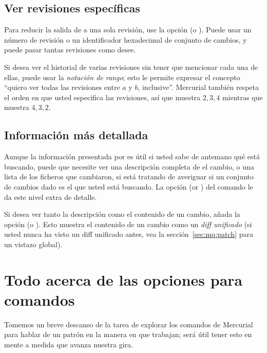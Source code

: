 \subsection{Ver revisiones específicas}

Para reducir la salida de  a una sola revisión, use la  
opción  (o ).  Puede usar un número
de revisión o un identificador hexadecimal de conjunto de cambios, y
puede pasar tantas revisiones como desee.


Si desea ver el historial de varias revisiones sin tener que mencionar
cada una de ellas, puede usar la \emph{notación de rango}; esto le
permite expresar el concepto ``quiero ver todas las revisiones entre
$a$ y $b$, inclusive''.
Mercurial también respeta el orden en que usted especifica las
revisiones, así que  muestra $2,3,4$ mientras
que  muestra $4,3,2$.

\subsection{Información más detallada}
Aunque la información presentada por  es útil si usted sabe
de antemano qué está buscando, puede que necesite ver una descripción
completa de el cambio, o una lista de los ficheros que cambiaron, si
está tratando de averiguar si un conjunto de cambios dado es el que
usted está buscando. La opción  (or ) del
comando  le da este nivel extra de detalle.

Si desea ver tanto la descripción como el contenido de un cambio,
añada la opción  (o ). Esto muestra
el contenido de un cambio como un \emph{diff unificado} (si usted
nunca ha visto un diff unificado antes, vea la
sección~\ref{sec:mq:patch} para un vistazo global).

\section{Todo acerca de las opciones para comandos}

Tomemos un breve descanso de la tarea de explorar los comandos de
Mercurial para hablar de un patrón en la manera en que trabajan; será
útil tener esto en mente a medida que avanza nuestra gira.

